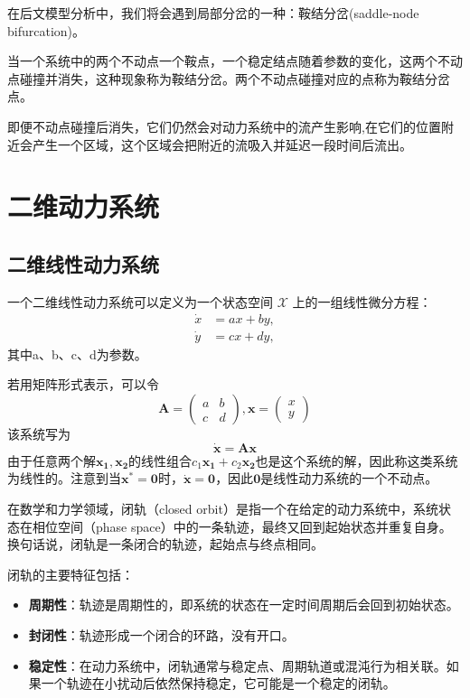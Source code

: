 在后文模型分析中，我们将会遇到局部分岔的一种：鞍结分岔(saddle-node bifurcation)。
\begin{defn}
    当一个系统中的两个不动点一个鞍点，一个稳定结点随着参数的变化，这两个不动点碰撞并消失，这种现象称为鞍结分岔。两个不动点碰撞对应的点称为鞍结分岔点。
\end{defn}
即便不动点碰撞后消失，它们仍然会对动力系统中的流产生影响,在它们的位置附近会产生一个区域，这个区域会把附近的流吸入并延迟一段时间后流出\cite{strogatz2018nonlinear}。
\section{二维动力系统}
\subsection{二维线性动力系统}
\begin{defn}[二维线性动力系统]

    一个二维线性动力系统可以定义为一个状态空间 $\mathcal{X}$ 上的一组线性微分方程：
    \begin{equation}
        \begin{aligned}
            \dot{x} & = a x + b y, \\
            \dot{y} & = c x + d y,
        \end{aligned}
    \end{equation}
    其中a、b、c、d为参数。
\end{defn}
若用矩阵形式表示，可以令
\begin{equation}
    \mathbf{A}= \begin{pmatrix}
        a & b \\
        c & d
    \end{pmatrix},\mathbf{x}=\begin{pmatrix}
        x \\y
    \end{pmatrix}
\end{equation}
该系统写为
\begin{equation}
    \dot{\mathbf{x}}=\mathbf{A}\mathbf{x}
\end{equation}
由于任意两个解$\mathbf{x_1},\mathbf{x_2}$的线性组合$c_1\mathbf{x_1}+c_2\mathbf{x_2}$也是这个系统的解，因此称这类系统为线性的。注意到当$\mathbf{x^*}=\mathbf{0}$时，$\dot{\mathbf{x}}=\mathbf{0}$，因此$\mathbf{0}$是线性动力系统的一个不动点。
\begin{defn}[闭轨]

    在数学和力学领域，闭轨（closed orbit）是指一个在给定的动力系统中，系统状态在相位空间（phase space）中的一条轨迹，最终又回到起始状态并重复自身。换句话说，闭轨是一条闭合的轨迹，起始点与终点相同。
\end{defn}
闭轨的主要特征包括：
\begin{itemize}
    \item \textbf{周期性}：轨迹是周期性的，即系统的状态在一定时间周期后会回到初始状态。
    \item \textbf{封闭性}：轨迹形成一个闭合的环路，没有开口。
    \item \textbf{稳定性}：在动力系统中，闭轨通常与稳定点、周期轨道或混沌行为相关联。如果一个轨迹在小扰动后依然保持稳定，它可能是一个稳定的闭轨。
\end{itemize}
